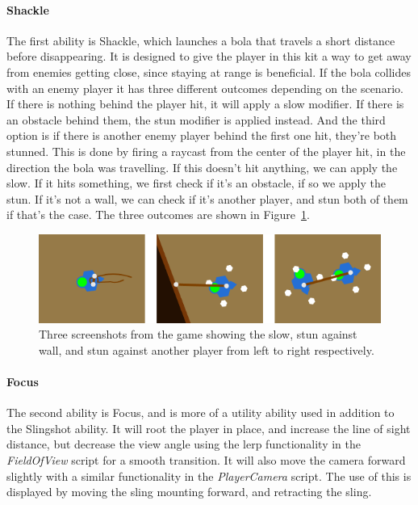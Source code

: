 \paragraph{Shackle}
The first ability is Shackle, which launches a bola that travels a short distance before disappearing. It is designed to give the player in this kit a way to get away from enemies getting close, since staying at range is beneficial. If the bola collides with an enemy player it has three different outcomes depending on the scenario. If there is nothing behind the player hit, it will apply a slow modifier. If there is an obstacle behind them, the stun modifier is applied instead. And the third option is if there is another enemy player behind the first one hit, they're both stunned. This is done by firing a raycast from the center of the player hit, in the direction the bola was travelling. If this doesn't hit anything, we can apply the slow. If it hits something, we first check if it's an obstacle, if so we apply the stun. If it's not a wall, we can check if it's another player, and stun both of them if that's the case. The three outcomes are shown in Figure~\ref{fig:shackleOutcomes}.

\begin{figure}[htbp]  %
  \centering
  \includegraphics[width=\textwidth]{images/ShackleOutcomes}
  \caption[Shackle outcomes]{Three screenshots from the game showing the slow, stun against wall, and stun against another player from left to right respectively.}
  \label{fig:shackleOutcomes}
\end{figure}

\paragraph{Focus}
The second ability is Focus, and is more of a utility ability used in addition to the Slingshot ability. It will root the player in place, and increase the line of sight distance, but decrease the view angle using the lerp functionality in the \emph{FieldOfView} script for a smooth transition. It will also move the camera forward slightly with a similar functionality in the \emph{PlayerCamera} script. The use of this is displayed by moving the sling mounting forward, and retracting the sling.

